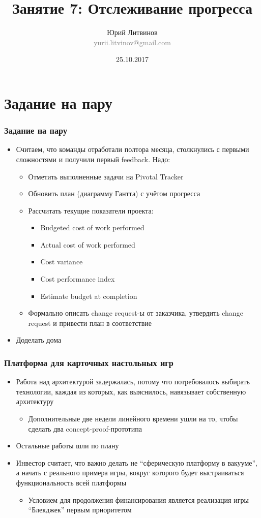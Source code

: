 \documentclass[xetex,mathserif,serif]{beamer}
\title{Занятие 7: Отслеживание прогресса}
\author[Юрий Литвинов]{Юрий Литвинов\\\small{\textcolor{gray}{yurii.litvinov@gmail.com}}}
\date{25.10.2017}
\begin{document}
	\frame{\titlepage}

	\section{Задание на пару}

	\begin{frame}
		\frametitle{Задание на пару}
		\begin{itemize}
			\item Считаем, что команды отработали полтора месяца, столкнулись с первыми сложностями и получили первый feedback. Надо:
			\begin{itemize}
				\item Отметить выполненные задачи на Pivotal Tracker
				\item Обновить план (диаграмму Гантта) с учётом прогресса
				\item Рассчитать текущие показатели проекта:
				\begin{itemize}
					\item Budgeted cost of work performed
					\item Actual cost of work performed
					\item Cost variance
					\item Cost performance index
					\item Estimate budget at completion
				\end{itemize}
				\item Формально описать change request-ы от заказчика, утвердить change request и привести план в соответствие
			\end{itemize}
			\item Доделать дома
		\end{itemize}
	\end{frame}

	\begin{frame}
		\frametitle{Платформа для карточных настольных игр}
		\begin{itemize}
			\item Работа над архитектурой задержалась, потому что потребовалось выбирать технологии, каждая из которых, как выяснилось, навязывает собственную архитектуру
			\begin{itemize}
				\item Дополнительные две недели линейного времени ушли на то, чтобы сделать два concept-proof-прототипа
			\end{itemize}
			\item Остальные работы шли по плану
			\item Инвестор считает, что важно делать не ``сферическую платформу в вакууме'', а начать с реального примера игры, вокруг которого будет выстраиваться функциональность всей платформы
			\begin{itemize}
				\item Условием для продолжения финансирования является реализация игры ``Блекджек'' первым приоритетом
			\end{itemize}
		\end{itemize}
	\end{frame}
\end{document}
